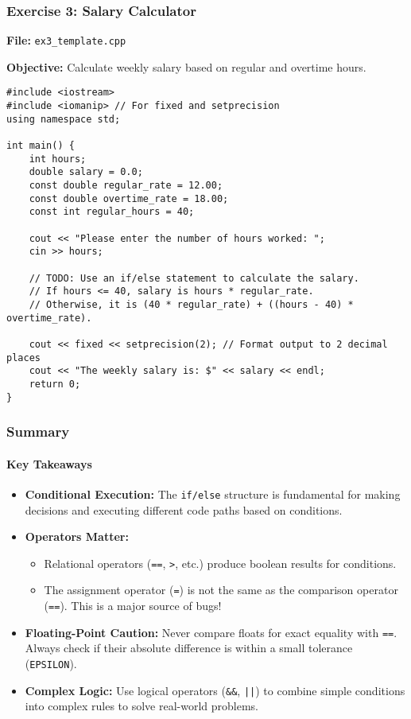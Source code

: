 \documentclass{beamer}
\begin{document}
\begin{frame}[fragile]
\frametitle{Exercise 3: Salary Calculator}
\textbf{File:} \texttt{ex3\_template.cpp}

\textbf{Objective:} Calculate weekly salary based on regular and overtime hours.

\begin{verbatim}
#include <iostream>
#include <iomanip> // For fixed and setprecision
using namespace std;

int main() {
    int hours;
    double salary = 0.0;
    const double regular_rate = 12.00;
    const double overtime_rate = 18.00;
    const int regular_hours = 40;

    cout << "Please enter the number of hours worked: ";
    cin >> hours;

    // TODO: Use an if/else statement to calculate the salary.
    // If hours <= 40, salary is hours * regular_rate.
    // Otherwise, it is (40 * regular_rate) + ((hours - 40) * overtime_rate).

    cout << fixed << setprecision(2); // Format output to 2 decimal places
    cout << "The weekly salary is: $" << salary << endl;
    return 0;
}
\end{verbatim}
\end{frame}

\begin{frame}
\frametitle{Summary}
\framesubtitle{Key Takeaways}
\begin{itemize}
    \item \textbf{Conditional Execution:} The \texttt{if/else} structure is fundamental for making decisions and executing different code paths based on conditions.
    \item \textbf{Operators Matter:}
    \begin{itemize}
        \item Relational operators (\texttt{==}, \texttt{>}, etc.) produce boolean results for conditions.
        \item The assignment operator (\texttt{=}) is not the same as the comparison operator (\texttt{==}). This is a major source of bugs!
    \end{itemize}
    \item \textbf{Floating-Point Caution:} Never compare floats for exact equality with \texttt{==}. Always check if their absolute difference is within a small tolerance (\texttt{EPSILON}).
    \item \textbf{Complex Logic:} Use logical operators (\texttt{\&\&}, \texttt{||}) to combine simple conditions into complex rules to solve real-world problems.
\end{itemize}
\end{frame}
\end{document}
